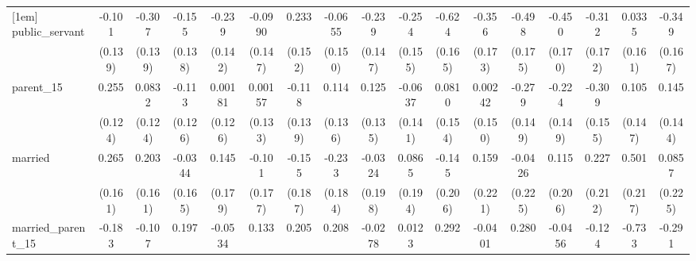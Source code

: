 {\begin{tabular}{l*{16}{c}}
[1em]
public\_servant      &      -0.101         &      -0.307\sym{*}  &      -0.155         &      -0.239         &     -0.0990         &       0.233         &     -0.0655         &      -0.239         &      -0.254         &      -0.624\sym{***}&      -0.356\sym{*}  &      -0.498\sym{**} &      -0.450\sym{**} &      -0.312         &      0.0335         &      -0.349\sym{*}  \\
                    &     (0.139)         &     (0.139)         &     (0.138)         &     (0.142)         &     (0.147)         &     (0.152)         &     (0.150)         &     (0.147)         &     (0.155)         &     (0.165)         &     (0.173)         &     (0.175)         &     (0.170)         &     (0.172)         &     (0.161)         &     (0.167)         \\
[1em]
parent\_15           &       0.255\sym{*}  &      0.0832         &      -0.113         &     0.00181         &     0.00157         &      -0.118         &       0.114         &       0.125         &     -0.0637         &      0.0810         &     0.00242         &      -0.279         &      -0.224         &      -0.309\sym{*}  &       0.105         &       0.145         \\
                    &     (0.124)         &     (0.124)         &     (0.126)         &     (0.126)         &     (0.133)         &     (0.139)         &     (0.136)         &     (0.135)         &     (0.141)         &     (0.154)         &     (0.150)         &     (0.149)         &     (0.149)         &     (0.155)         &     (0.147)         &     (0.144)         \\
[1em]
married             &       0.265         &       0.203         &     -0.0344         &       0.145         &      -0.101         &      -0.155         &      -0.233         &     -0.0324         &      0.0865         &      -0.145         &       0.159         &     -0.0426         &       0.115         &       0.227         &       0.501\sym{*}  &      0.0857         \\
                    &     (0.161)         &     (0.161)         &     (0.165)         &     (0.179)         &     (0.177)         &     (0.187)         &     (0.184)         &     (0.198)         &     (0.194)         &     (0.206)         &     (0.221)         &     (0.225)         &     (0.206)         &     (0.212)         &     (0.217)         &     (0.225)         \\
[1em]
married\_parent\_15   &      -0.183         &      -0.107         &       0.197         &     -0.0534         &       0.133         &       0.205         &       0.208         &     -0.0278         &      0.0123         &       0.292         &     -0.0401         &       0.280         &     -0.0456         &      -0.124         &      -0.733\sym{**} &      -0.291         \\

\end{tabular}}
